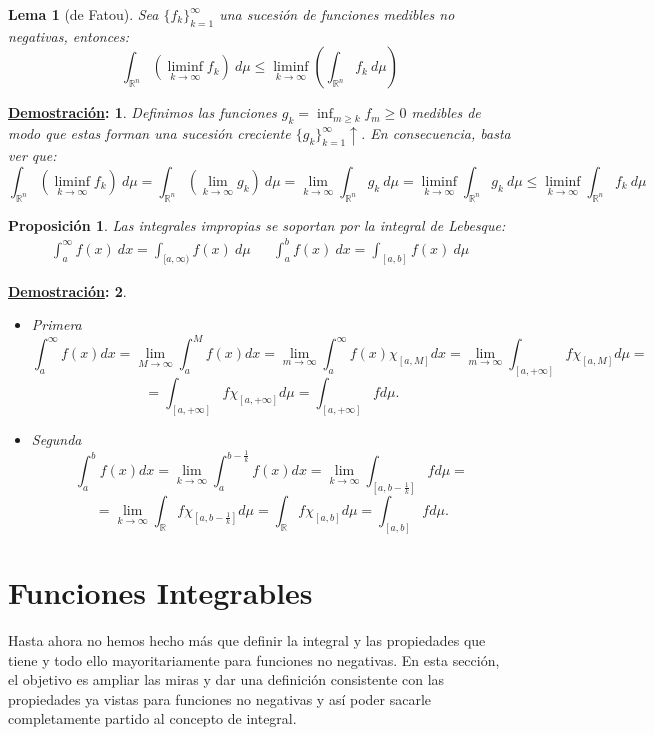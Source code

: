 \documentclass[10pt,a4paper,openright]{book}
\theoremstyle{break}
\newtheorem*{lema}{Lema}
\newtheorem*{prop}{Proposición}
\newtheorem*{demo}{\underline{Demostración}:}
\newcommand{\dif}[1]{\ d#1}
\begin{document}
\begin{lema}[de Fatou]
Sea $\{f_k\}_{k=1}^{\infty}$ una sucesión de funciones medibles no negativas, entonces: 
$$\int_{\mathbb{R}^n} \left( \liminf_{k \rightarrow \infty}f_k \right) \dif{\mu} \le \liminf_{k \rightarrow \infty} \left(\int_{\mathbb{R}^n} f_k \dif{\mu}\right) $$
\end{lema}
\begin{demo}
Definimos las funciones $g_k = \inf_{m \ge k} f_m \ge 0$ medibles de modo que estas forman una sucesión creciente $\{g_k\}_{k=1}^\infty\uparrow$. En consecuencia, basta ver que:
$$\int_{\mathbb{R}^n} \left(\liminf_{k \rightarrow \infty}f_k \right) \dif{\mu} = \int_{\mathbb{R}^n} \left(\lim_{k \rightarrow \infty}g_k \right)\dif{\mu} =  \lim_{k \rightarrow \infty} \int_{\mathbb{R}^n} g_k \dif{\mu} = \liminf_{k \rightarrow \infty}\int_{\mathbb{R}^n} g_k \dif{\mu} \le \liminf_{k \rightarrow \infty} \int_{\mathbb{R}^n} f_k \dif{\mu}$$
\end{demo}

\begin{prop}
Las integrales impropias se soportan por la integral de Lebesque:
\begin{align*}
\int_a^\infty f(x) \dif{x} = \int_{[a, \infty)}f(x)\dif{\mu} & &\int_a^b f(x)\dif{x} = \int_{[a,b]} f(x) \dif{\mu}
\end{align*}
\end{prop}
\begin{demo}
\begin{itemize}
\item Primera
$$\int_a^{\infty} f \left(x\right) dx = \lim_{M \rightarrow \infty} \int_a^M f \left(x\right) dx = \lim_{m \rightarrow \infty} \int_a^{\infty} f \left(x\right) \chi_{\left[a, M\right]}dx = \lim_{m \rightarrow \infty} \int_{\left[a, +\infty\right]} f \chi_{\left[a, M\right]} d \mu =$$
$$= \int_{\left[a, +\infty\right]} f \chi_{\left[a, +\infty\right]} d \mu = \int_{\left[a, +\infty\right]} f d \mu. $$
\item Segunda
$$\int_a^b f \left(x\right) dx = \lim_{k \rightarrow \infty}\int_a^{b - \frac{1}{k}} f \left(x\right) dx = \lim_{k \rightarrow \infty} \int_{\left[a, b - \frac{1}{k}\right]} f d \mu =$$
$$= \lim_{k \rightarrow \infty} \int_{\mathbb{R}} f \chi_{\left[a, b - \frac{1}{k}\right]} d \mu = \int_{\mathbb{R}} f \chi_{\left[a, b\right]} d \mu = \int_{\left[a, b\right]} f d \mu.$$
\end{itemize}
\end{demo}

\section{Funciones Integrables}
Hasta ahora no hemos hecho más que definir la integral y las propiedades que tiene y todo ello mayoritariamente para funciones no negativas. En esta sección, el objetivo es ampliar las miras y dar una definición consistente con las propiedades ya vistas para funciones no negativas y así poder sacarle completamente partido al concepto de integral.
\end{document}

